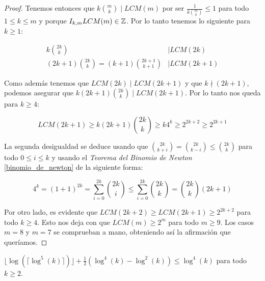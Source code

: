 \begin{proof}
	Tenemos entonces que $k\binom{m}{k} \mid LCM(m)$ por ser $\frac{1}{k\binom{m}{k}} \leq 1$ para todo $1 \leq k \leq m$ y porque $I_{k,m}LCM(m) \in \mathbb{Z}$. Por lo tanto tenemos lo siguiente para $k \geq 1$:
	
	\begin{align}
	k\binom{2k}{k} &\mid LCM(2k)\\
	(2k+1)\binom{2k}{k} = (k+1)\binom{2k+1}{k+1} &\mid LCM(2k+1)
	\end{align}
	
	Como además tenemos que $LCM(2k) \mid LCM(2k+1)$ y que $k \nmid (2k+1)$, podemos asegurar que $k(2k+1)\displaystyle\binom{2k}{k} \mid LCM(2k+1)$. Por lo tanto nos queda para $k \geq 4$:
	
	\[ LCM(2k+1) \geq k(2k+1)\binom{2k}{k} \geq k4^k \geq 2^{2k+2} \geq 2^{2k+1} \]
	
	La segunda desigualdad se deduce usando que $\displaystyle\binom{2k}{k+i} = \binom{2k}{k-i} \leq \binom{2k}{k}$ para todo $0 \leq i \leq k$ y usando el \textit{Teorema del Binomio de Newton} \ref{binomio_de_newton} de la siguiente forma:
	
	\[ 4^k = (1+1)^{2k} = \sum_{i=0}^{2k}\binom{2k}{i} \leq \sum_{i=0}^{2k}\binom{2k}{k} = \binom{2k}{k}(2k+1) \]
	
	Por otro lado, es evidente que $LCM(2k+2) \geq LCM(2k+1) \geq 2^{2k+2}$ para todo $k \geq 4$. Esto nos deja con que $LCM(m) \geq 2^m$ para todo $m \geq 9$. Los casos $m = 8$ y $m = 7$ se comprueban a mano, obteniendo así la afirmación que queríamos.
\end{proof}

\begin{lema}\label{desigualdad_log4_log2}
	$\lfloor \log(\lceil \log^5(k) \rceil) \rfloor + \frac{1}{2}\left( \log^4(k) - \log^2(k) \right) \leq \log^4(k)$ para todo $k \geq 2$.
\end{lema}

